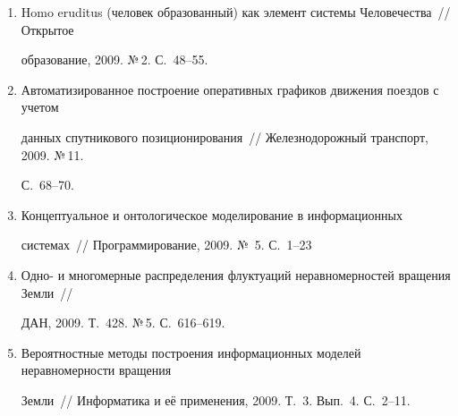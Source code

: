 \begin{enumerate}[1.]
О~выборе параметра сглаживания в ядерных оценках плотности~// Вестник Моск.\linebreak


ун-та. Сер. 15 <<Вычислительная математика и кибернетика>>, 2009. Вып.~3. С.~29--35.





\item {}


Homo eruditus (человек образованный) как элемент системы Человечества~// Открытое 


образование, 2009. №\,2. С.~48--55.





\item {}


Автоматизированное построение оперативных графиков движения поездов с учетом 


данных спутникового позиционирования~//  Железнодорожный транспорт, 2009. №\,11. 


С.~68--70.





\item {}


Концептуальное и онтологическое моделирование в информационных 


системах~// Программирование, 2009. №\, 5. С.~1--23





\item {}


Одно- и многомерные распределения флуктуаций неравномерностей вращения Земли~// 


ДАН, 2009. Т.~428. №\,5. С.~616--619.





\item {}


Вероятностные методы построения информационных моделей неравномерности вращения 


Земли~// Информатика и её применения, 2009. Т.~3. Вып.~4. С.~2--11.






\end{enumerate}

